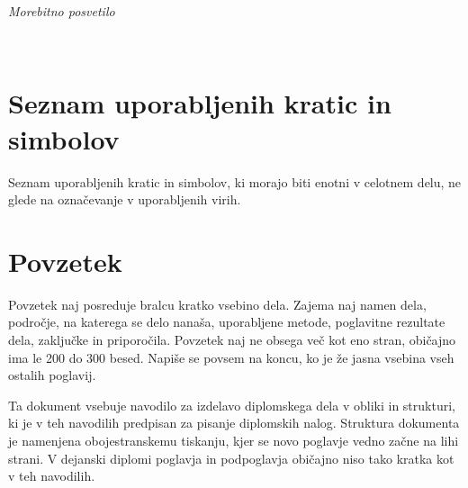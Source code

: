 \documentclass[12pt,a4paper,openany]{book}
\begin{document}
\thispagestyle{empty}

$\;$ 

\vspace{5cm}
\hfill {\Large \em Morebitno posvetilo}
\thispagestyle{empty}

\newpage



\ \thispagestyle{empty}

\newpage


\renewcommand\thepage{} 
\tableofcontents 
\renewcommand\thepage{\arabic{page}}

\thispagestyle{empty}



\chapter*{Seznam uporabljenih kratic in simbolov}

\thispagestyle{empty}

Seznam uporabljenih kratic in simbolov, ki morajo biti enotni v celotnem delu, ne glede na označevanje v uporabljenih virih.


\clearpage{\pagestyle{empty}\cleardoublepage}


\setcounter{page}{1}

\chapter*{Povzetek}


Povzetek naj posreduje bralcu kratko vsebino dela. Zajema naj namen dela, področje, na katerega se delo nanaša,
uporabljene metode, poglavitne rezultate dela, zaključke in priporočila. 
Povzetek naj ne obsega več kot eno stran, obi\v cajno ima le 200 do 300 besed. Napiše se povsem na koncu,
ko je že jasna vsebina vseh ostalih poglavij.

Ta dokument vsebuje navodilo za izdelavo diplomskega dela v obliki in strukturi, ki je v teh navodilih predpisan za
pisanje diplomskih nalog. Struktura dokumenta je namenjena obojestranskemu tiskanju, kjer se novo poglavje vedno za\v cne na lihi strani.
V dejanski diplomi poglavja in podpogla\-vja  obi\v cajno niso tako kratka kot v teh navodilih.
\end{document}
